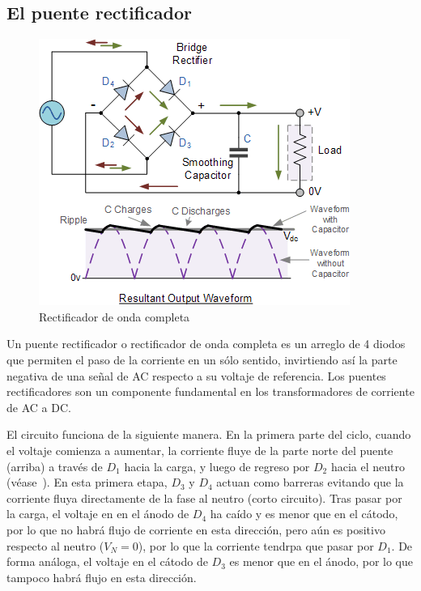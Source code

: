 %
%


\subsection{El puente rectificador}%
\label{seq:intro-bridge}

\begin{figure}
	\centering
	\includegraphics[width=0.3\columnwidth]{img/bridge.png}
	\caption[Rectificador de onda completa]{Rectificador de onda completa\footnotemark{}}%
	\label{fig:bridge}
\end{figure}
Un puente rectificador o rectificador de onda completa es un arreglo de 4 diodos que permiten el paso de la corriente en un sólo sentido, invirtiendo así la parte negativa de una señal de AC respecto a su voltaje de referencia.
Los puentes rectificadores son un componente fundamental en los transformadores de corriente de AC a DC.

El circuito funciona de la siguiente manera.
En la primera parte del ciclo, cuando el voltaje comienza a aumentar, la corriente fluye de la parte norte del puente (arriba) a través de $D_1$ hacia la carga, y luego de regreso por $D_2$ hacia el neutro (véase~).
En esta primera etapa, $D_3$ y $D_4$ actuan como barreras evitando que la corriente fluya directamente de la fase al neutro (corto circuito).
Tras pasar por la carga, el voltaje en en el ánodo de $D_4$ ha caído y es menor que en el cátodo, por lo que no habrá flujo de corriente en esta dirección, pero aún es positivo respecto al neutro ($V_{N}=0$), por lo que la corriente tendrpa que pasar por $D_1$.
De forma análoga, el voltaje en el cátodo de $D_3$ es menor que en el ánodo, por lo que tampoco habrá flujo en esta dirección.

